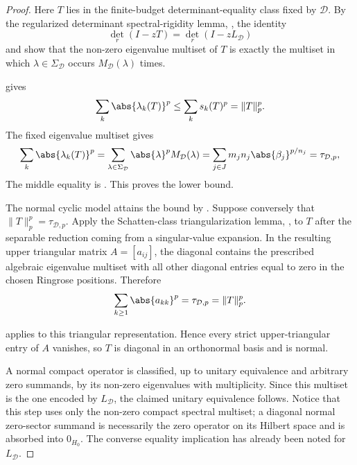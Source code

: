\begin{proof}
  Here \(T\) lies in the finite-budget determinant-equality class fixed by
  \(\mathcal D\). By the regularized determinant
  spectral-rigidity lemma,
  , the identity
  \[
    \det_r(I-zT)=\det_r(I-zL_{\mathcal D})
  \]
  and  show that the non-zero
  eigenvalue multiset of \(T\) is exactly the multiset in which
  \(\lambda\in\Sigma_{\mathcal D}\) occurs
  \(M_{\mathcal D}(\lambda)\) times.

   gives
  \[
    \sum_k\abs{\lambda_k(T)}^p
    \le \sum_ks_k(T)^p
    =\|T\|_p^p.
  \]
  The fixed eigenvalue multiset gives
  \[
    \sum_k\abs{\lambda_k(T)}^p
    =\sum_{\lambda\in\Sigma_{\mathcal D}}
      \abs{\lambda}^pM_{\mathcal D}(\lambda)
    =\sum_{j\in J}m_jn_j\abs{\beta_j}^{p/n_j}
    =\tau_{\mathcal D,p},
  \]
  The middle equality is .
  This proves the lower bound.

  The normal cyclic model attains the bound by
  . Suppose conversely
  that \(\|T\|_p^p=\tau_{\mathcal D,p}\). Apply the Schatten-class
  triangularization lemma, , to
  \(T\) after the separable reduction coming from a singular-value
  expansion.
  In the resulting upper triangular matrix \(A=[a_{ij}]\), the diagonal
  contains the prescribed algebraic eigenvalue multiset with all other diagonal
  entries equal to zero in the chosen Ringrose positions. Therefore
  \[
    \sum_{k\ge1}\abs{a_{kk}}^p=\tau_{\mathcal D,p}=\|T\|_p^p.
  \]

   applies to this
  triangular representation. Hence every strict upper-triangular entry of
  \(A\) vanishes, so \(T\) is diagonal in an orthonormal basis and is
  normal.

  A normal compact operator is classified, up to unitary equivalence and
  arbitrary zero summands, by its non-zero eigenvalues with multiplicity.
  Since this multiset is the one encoded by \(L_{\mathcal D}\), the
  claimed unitary equivalence follows. Notice that this step uses only the
  non-zero compact spectral multiset; a diagonal normal zero-sector summand is
  necessarily the zero operator on its Hilbert space and is absorbed into
  \(0_{H_0}\).  The converse equality implication has already been noted for
  \(L_{\mathcal D}\).


\end{proof}
